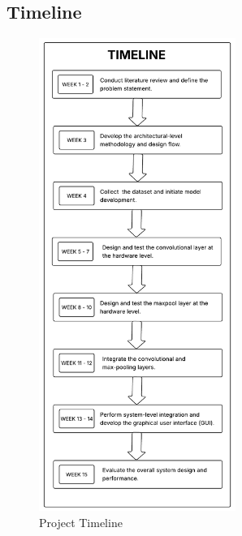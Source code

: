     \subsection{Timeline}
    \begin{figure}[H]
        \centering
        \includegraphics[width=0.57\textwidth]{images/timeline_final.png}
        \caption{Project Timeline}
        \label{fig:timeline}
    \end{figure}
    \newpage
    
    
    
    



    
    

